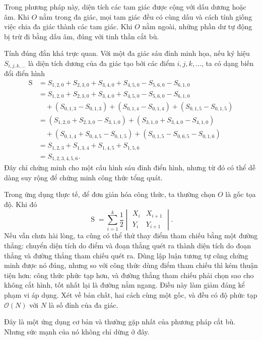 \documentclass[11pt]{article}
\newcommand{\Oh}{\mathcal{O}}
\newcommand{\sgnarea}{\operatorname{S}}
\begin{document}
Trong phương pháp này, diện tích các tam giác được cộng với dấu dương hoặc âm.
Khi $O$ nằm trong đa giác, mọi tam giác đều có cùng dấu và cách tính giống
việc chia đa giác thành các tam giác. Khi $O$ nằm ngoài, những phần dư tự động
bị trừ đi bằng dấu âm, đúng với tinh thần cắt bù.

Tính đúng đắn khá trực quan. Với một đa giác sáu đỉnh minh họa, nếu ký hiệu
$S_{i,j,k,\ldots}$ là diện tích dương của đa giác tạo bởi các điểm
$i,j,k,\ldots$, ta có dạng biến đổi điển hình
\[
\begin{aligned}
  \sgnarea
    &= S_{1,2,0}+S_{2,3,0}+S_{3,4,0}+S_{4,5,0}
       -S_{5,6,0}-S_{6,1,0}\\
    &= S_{1,2,0}+S_{2,3,0}+S_{3,4,0}+S_{4,5,0}
       -S_{5,6,0}-S_{6,1,0}\\
    &\quad +(S_{0,1,3}-S_{0,1,3})
       +(S_{0,1,4}-S_{0,1,4})
       +(S_{0,1,5}-S_{0,1,5})\\
    &= (S_{1,2,0}+S_{2,3,0}-S_{3,1,0})
       +(S_{3,1,0}+S_{3,4,0}-S_{4,1,0})\\
    &\quad +(S_{0,1,4}+S_{0,4,5}-S_{0,1,5})
       +(S_{0,1,5}-S_{0,6,5}-S_{0,1,6})\\
    &= S_{1,2,3}+S_{1,3,4}+S_{1,4,5}+S_{1,5,6}\\
    &= S_{1,2,3,4,5,6}.
\end{aligned}
\]
Đây chỉ chứng minh cho một cấu hình sáu đỉnh điển hình, nhưng từ đó có thể dễ
dàng suy rộng để chứng minh công thức tổng quát.

Trong ứng dụng thực tế, để đơn giản hóa công thức, ta thường chọn $O$ là gốc
tọa độ. Khi đó
\[
  \sgnarea =
  \sum_{i=1}^{k}
  \frac12
  \begin{vmatrix}
    X_i & X_{i+1}\\
    Y_i & Y_{i+1}
  \end{vmatrix}.
\]
Nếu vẫn chưa hài lòng, ta cũng có thể thử thay điểm tham chiếu bằng một đường
thẳng: chuyển diện tích do điểm và đoạn thẳng quét ra thành diện tích do đoạn
thẳng và đường thẳng tham chiếu quét ra. Dùng lập luận tương tự cũng chứng
minh được nó đúng, nhưng so với công thức dùng điểm tham chiếu thì kém thuận
tiện hơn: công thức phức tạp hơn, và đường thẳng tham chiếu phải chọn sao cho
không cắt hình, tốt nhất lại là đường nằm ngang. Điều này làm giảm đáng kể
phạm vi áp dụng. Xét về bản chất, hai cách cùng một gốc, và đều có độ phức tạp
$\Oh(N)$ với $N$ là số đỉnh của đa giác.

Đây là một ứng dụng cơ bản và thường gặp nhất của phương pháp cắt bù. Nhưng
sức mạnh của nó không chỉ dừng ở đây.
\end{document}
